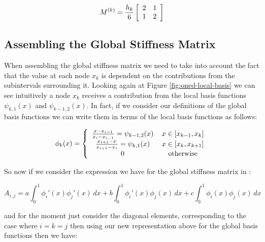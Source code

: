 \begin{equation}\label{eq:oned-deterministic-local-mass}
    M^{(k)} = \frac{h_k}{6}\left[\begin{array}{c c}
                2 & 1 \\ 1 & 2
              \end{array}\right]
\end{equation}

\subsection{Assembling the Global Stiffness Matrix}\label{sec:oned-deterministic-global-stiffness-assembly}

When assembling the global stiffness matrix we need to take into account the
fact that the value at each node $x_k$ is dependent on the contributions from
the subintervals surrounding it. Looking again at Figure
\ref{fig:oned-local-basis} we can see intuitively a node $x_k$ receives a
contribution from the local basis functions $\psi_{k,1}(x)$ and
$\psi_{{k-1},2}(x)$. In fact, if we consider our definitions of the global
basis functions  we can write them in terms of the
local basis functions as follows:

\begin{equation}\label{eq:oned-deterministic-local-global-basis}
    \phi_k(x) = \left\{\begin{array}{c c}
                    \frac{x - x_{i-1}}{x_i - x_{i-1}} = \psi_{{k-1},2}(x)\, & x \in [x_{k-1}, x_k] \\
                    \frac{x_{i+1} - x}{x_{i+1} - x_i} = \psi_{k, 1}(x)\, & x \in [x_k, x_{k+1}] \\
                    0\, & \text{otherwise}
             \end{array}\right.
\end{equation}

So now if we consider the expression we have for the global stiffness matrix in
:

\[
   A_{i,j} = a\int_0^1\phi_i'(x)\phi_j'(x)\, dx
             + b\int_0^1\phi_i'(x)\phi_j(x)\, dx
             + c\int_0^1\phi_i(x)\phi_j(x)\, dx
\]

and for the moment just consider the diagonal elements, corresponding to the
case where $i = k = j$ then using our new representation above for the global
basis functions then we have:

